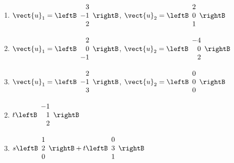 \begin{multicols}{2}
\begin{ex}
\begin{enumerate}[label={\alph*.}]
\item $\vect{u}_{1} = \leftB
\begin{array}{r}
3\\
-1\\
2
\end{array}
\rightB$, 
$\vect{u}_{2} = \leftB
\begin{array}{r}
2\\
0\\
1
\end{array}
\rightB
$

\item $\vect{u}_{1} = \leftB
\begin{array}{r}
2\\
0\\
-1
\end{array}
\rightB$, 
$\vect{u}_{2} = \leftB
\begin{array}{r}
-4\\
0\\
2
\end{array}
\rightB
$

\item $\vect{u}_{1} = \leftB
\begin{array}{r}
2\\
-1\\
3
\end{array}
\rightB$, 
$\vect{u}_{2} = \leftB
\begin{array}{r}
0\\
0\\
0
\end{array}
\rightB
$


\end{enumerate}
\begin{sol}
\begin{enumerate}[label={\alph*.}]
\setcounter{enumi}{1}
\item  $t \leftB
\begin{array}{r}
-1\\
1\\
2
\end{array}
\rightB
$

\setcounter{enumi}{3}
\item $s \leftB
\begin{array}{r}
1\\
2\\
0
\end{array}
\rightB
+
t \leftB
\begin{array}{r}
0\\
3\\
1
\end{array}
\rightB
$



\end{enumerate}
\end{sol}
\end{ex}
\end{multicols}
